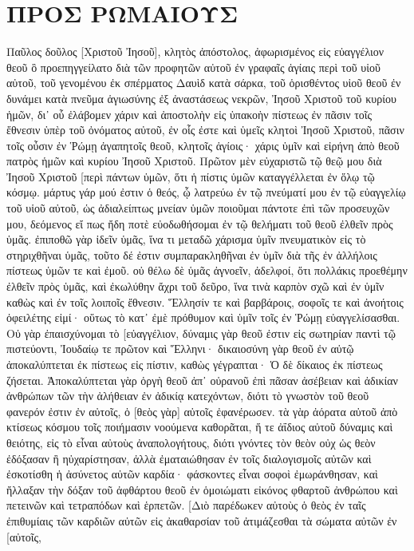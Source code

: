 \section{ΠΡΟΣ ΡΩΜΑΙΟΥΣ}
Παῦλος δοῦλος [Χριστοῦ Ἰησοῦ], κλητὸς ἀπόστολος, ἀφωρισμένος εἰς εὐαγγέλιον θεοῦ 
ὃ προεπηγγείλατο διὰ τῶν προφητῶν αὐτοῦ ἐν γραφαῖς ἁγίαις 
περὶ τοῦ υἱοῦ αὐτοῦ, τοῦ γενομένου ἐκ σπέρματος Δαυὶδ κατὰ σάρκα, 
τοῦ ὁρισθέντος υἱοῦ θεοῦ ἐν δυνάμει κατὰ πνεῦμα ἁγιωσύνης ἐξ ἀναστάσεως νεκρῶν, Ἰησοῦ Χριστοῦ τοῦ κυρίου ἡμῶν, 
δι᾽ οὗ ἐλάβομεν χάριν καὶ ἀποστολὴν εἰς ὑπακοὴν πίστεως ἐν πᾶσιν τοῖς ἔθνεσιν ὑπὲρ τοῦ ὀνόματος αὐτοῦ, 
ἐν οἷς ἐστε καὶ ὑμεῖς κλητοὶ Ἰησοῦ Χριστοῦ, 
πᾶσιν τοῖς οὖσιν ἐν Ῥώμῃ ἀγαπητοῖς θεοῦ, κλητοῖς ἁγίοις· χάρις ὑμῖν καὶ εἰρήνη ἀπὸ θεοῦ πατρὸς ἡμῶν καὶ κυρίου Ἰησοῦ Χριστοῦ. 
Πρῶτον μὲν εὐχαριστῶ τῷ θεῷ μου διὰ Ἰησοῦ Χριστοῦ [περὶ πάντων ὑμῶν, ὅτι ἡ πίστις ὑμῶν καταγγέλλεται ἐν ὅλῳ τῷ κόσμῳ. 
μάρτυς γάρ μού ἐστιν ὁ θεός, ᾧ λατρεύω ἐν τῷ πνεύματί μου ἐν τῷ εὐαγγελίῳ τοῦ υἱοῦ αὐτοῦ, ὡς ἀδιαλείπτως μνείαν ὑμῶν ποιοῦμαι 
πάντοτε ἐπὶ τῶν προσευχῶν μου, δεόμενος εἴ πως ἤδη ποτὲ εὐοδωθήσομαι ἐν τῷ θελήματι τοῦ θεοῦ ἐλθεῖν πρὸς ὑμᾶς. 
ἐπιποθῶ γὰρ ἰδεῖν ὑμᾶς, ἵνα τι μεταδῶ χάρισμα ὑμῖν πνευματικὸν εἰς τὸ στηριχθῆναι ὑμᾶς, 
τοῦτο δέ ἐστιν συμπαρακληθῆναι ἐν ὑμῖν διὰ τῆς ἐν ἀλλήλοις πίστεως ὑμῶν τε καὶ ἐμοῦ. 
οὐ θέλω δὲ ὑμᾶς ἀγνοεῖν, ἀδελφοί, ὅτι πολλάκις προεθέμην ἐλθεῖν πρὸς ὑμᾶς, καὶ ἐκωλύθην ἄχρι τοῦ δεῦρο, ἵνα τινὰ καρπὸν σχῶ καὶ ἐν ὑμῖν καθὼς καὶ ἐν τοῖς λοιποῖς ἔθνεσιν. 
Ἕλλησίν τε καὶ βαρβάροις, σοφοῖς τε καὶ ἀνοήτοις ὀφειλέτης εἰμί· 
οὕτως τὸ κατ᾽ ἐμὲ πρόθυμον καὶ ὑμῖν τοῖς ἐν Ῥώμῃ εὐαγγελίσασθαι. 
Οὐ γὰρ ἐπαισχύνομαι τὸ [εὐαγγέλιον, δύναμις γὰρ θεοῦ ἐστιν εἰς σωτηρίαν παντὶ τῷ πιστεύοντι, Ἰουδαίῳ τε πρῶτον καὶ Ἕλληνι· 
δικαιοσύνη γὰρ θεοῦ ἐν αὐτῷ ἀποκαλύπτεται ἐκ πίστεως εἰς πίστιν, καθὼς γέγραπται· Ὁ δὲ δίκαιος ἐκ πίστεως ζήσεται. 
Ἀποκαλύπτεται γὰρ ὀργὴ θεοῦ ἀπ᾽ οὐρανοῦ ἐπὶ πᾶσαν ἀσέβειαν καὶ ἀδικίαν ἀνθρώπων τῶν τὴν ἀλήθειαν ἐν ἀδικίᾳ κατεχόντων, 
διότι τὸ γνωστὸν τοῦ θεοῦ φανερόν ἐστιν ἐν αὐτοῖς, ὁ [θεὸς γὰρ] αὐτοῖς ἐφανέρωσεν. 
τὰ γὰρ ἀόρατα αὐτοῦ ἀπὸ κτίσεως κόσμου τοῖς ποιήμασιν νοούμενα καθορᾶται, ἥ τε ἀΐδιος αὐτοῦ δύναμις καὶ θειότης, εἰς τὸ εἶναι αὐτοὺς ἀναπολογήτους, 
διότι γνόντες τὸν θεὸν οὐχ ὡς θεὸν ἐδόξασαν ἢ ηὐχαρίστησαν, ἀλλὰ ἐματαιώθησαν ἐν τοῖς διαλογισμοῖς αὐτῶν καὶ ἐσκοτίσθη ἡ ἀσύνετος αὐτῶν καρδία· 
φάσκοντες εἶναι σοφοὶ ἐμωράνθησαν, 
καὶ ἤλλαξαν τὴν δόξαν τοῦ ἀφθάρτου θεοῦ ἐν ὁμοιώματι εἰκόνος φθαρτοῦ ἀνθρώπου καὶ πετεινῶν καὶ τετραπόδων καὶ ἑρπετῶν. 
[Διὸ παρέδωκεν αὐτοὺς ὁ θεὸς ἐν ταῖς ἐπιθυμίαις τῶν καρδιῶν αὐτῶν εἰς ἀκαθαρσίαν τοῦ ἀτιμάζεσθαι τὰ σώματα αὐτῶν ἐν [αὐτοῖς, 
